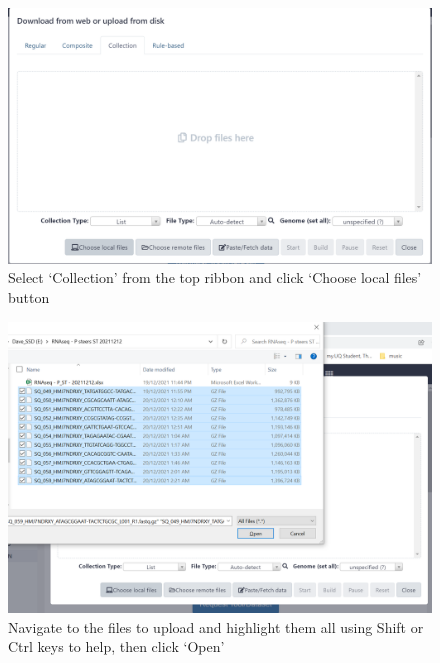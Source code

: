 \documentclass[
]{book}
\begin{document}
\begin{figure}

{\centering \includegraphics[width=1\linewidth]{images/image002} 

}

\caption{Select ‘Collection’ from the top ribbon and click ‘Choose local files’ button}\label{fig:chunk2}
\end{figure}

\begin{figure}

{\centering \includegraphics[width=1\linewidth]{images/image003} 

}

\caption{Navigate to the files to upload and highlight them all using Shift or Ctrl keys to help, then click ‘Open’}\label{fig:chunk3}
\end{figure}
\end{document}
